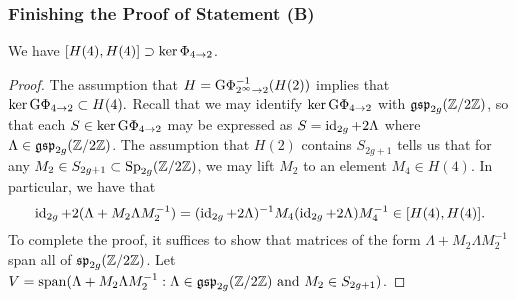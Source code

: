 \subsubsection{Finishing the Proof of Statement (B)} 	
\label{subsection:finishing-the-proof}
\begin{proposition} \label{lemma:contains-mod-2}
	We have $[H(4), H(4)] \supset \ker \Phi_{4 \to 2}$. 
\end{proposition} 
\begin{proof} 
	The assumption that 
    \(
    	H = \mathrm{G}\Phi_{2^\infty \to 2}^{-1}(H(2))
    \)
    implies that 
	\(
	\ker \mathrm{G}\Phi_{4 \to 2} \subset H(4). 
	\)
	Recall that we may identify $\ker \mathrm{G}\Phi_{4 \to 2}$ with $\mathfrak{gsp}_{2g}(\mathbb Z/2\mathbb Z)$, so that each $S \in \ker \mathrm{G}\Phi_{4 \to 2}$ may be expressed as $S = \operatorname{id}_{2g} + 2\Lambda$ where $\Lambda \in \mathfrak{gsp}_{2g}({\mathbb Z} / 2 \mathbb Z)$. The assumption that $H(2)$ contains $S_{2g+1}$ tells us that for any $M_2 \in S_{2g+1} \subset \operatorname{Sp}_{2g}({\mathbb Z} / 2 {\mathbb Z})$, we may lift $M_2$ to an element $M_4 \in H(4)$. In particular, we have that  
$$\operatorname{id}_{2g} + 2(\Lambda + M_2 \Lambda M_2^{-1}) = (\operatorname{id}_{2g} + 2\Lambda)^{-1}M_4(\operatorname{id}_{2g} + 2\Lambda)M_4^{-1} \in [H(4), H(4)].$$
To complete the proof, it suffices to show that matrices of the form $\Lambda + M_2 \Lambda M_2^{-1}$ span all of $\mathfrak{sp}_{2g}({\mathbb Z} / 2{\mathbb Z})$. Let $V = \operatorname{span}(\Lambda + M_2 \Lambda M_2^{-1} : \Lambda \in \mathfrak{gsp}_{2g}(\mathbb Z/2\mathbb Z) \text{ and } M_2 \in S_{2g+1})$.
	

\end{proof}
